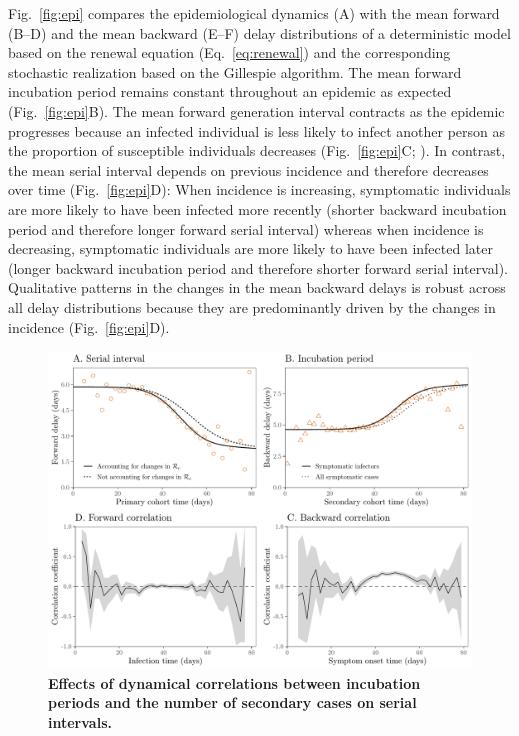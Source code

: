\documentclass[12pt]{article}
\newcommand{\eref}[1]{Eq.~\ref{eq:#1}}
\newcommand{\fref}[1]{Fig.~\ref{fig:#1}}
\begin{document}
\fref{epi} compares the epidemiological dynamics (A) with the mean forward (B--D) and the mean backward (E--F) delay distributions of a deterministic model based on the renewal equation (\eref{renewal}) and the corresponding stochastic realization based on the Gillespie algorithm.
The mean forward incubation period remains constant throughout an epidemic as expected (\fref{epi}B).
The mean forward generation interval contracts as the epidemic progresses because an infected individual is less likely to infect another person as the proportion of susceptible individuals decreases (\fref{epi}C; \cite{champredon2015intrinsic}).
In contrast, the mean serial interval depends on previous incidence and therefore decreases over time (\fref{epi}D):
When incidence is increasing, symptomatic individuals are more likely to have been infected more recently (shorter backward incubation period and therefore longer forward serial interval) whereas when incidence is decreasing, symptomatic individuals are more likely to have been infected later (longer backward incubation period and therefore shorter forward serial interval).
Qualitative patterns in the changes in the mean backward delays is robust across all delay distributions because they are predominantly driven by the changes in incidence (\fref{epi}D).

\begin{figure}[!th]
\includegraphics[width=\textwidth]{forward_tease.pdf}
\caption{
\textbf{Effects of dynamical correlations between incubation periods and the number of secondary cases on serial intervals.}
}
\label{fig:tease}
\end{figure}
\end{document}
